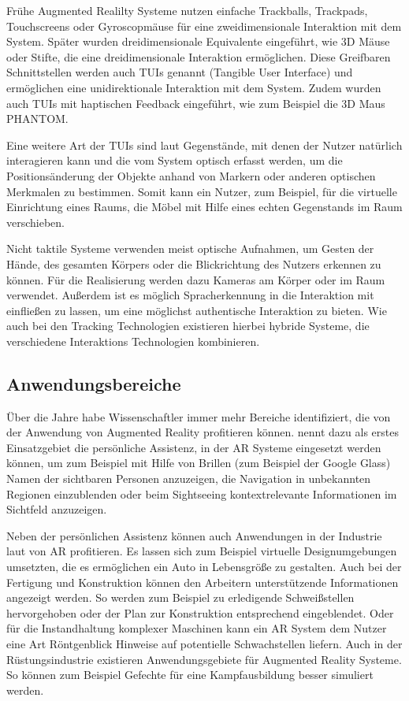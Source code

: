 Frühe Augmented Realilty Systeme nutzen einfache Trackballs, Trackpads, Touchscreens oder Gyroscopmäuse für eine zweidimensionale Interaktion mit dem System. Später wurden dreidimensionale Equivalente eingeführt, wie 3D Mäuse oder Stifte, die eine dreidimensionale Interaktion ermöglichen. Diese Greifbaren Schnittstellen werden auch TUIs genannt (Tangible User Interface) und ermöglichen eine unidirektionale Interaktion mit dem System. Zudem wurden auch TUIs mit haptischen Feedback eingeführt, wie zum Beispiel die 3D Maus PHANTOM. \citep{van2010survey} 

Eine weitere Art der TUIs sind laut \citet{azuma2001recent} Gegenstände, mit denen der Nutzer natürlich interagieren kann und die vom System optisch erfasst werden, um die Positionsänderung der Objekte anhand von Markern oder anderen optischen Merkmalen zu bestimmen. Somit kann ein Nutzer, zum Beispiel, für die virtuelle Einrichtung eines Raums, die Möbel mit Hilfe eines echten Gegenstands im Raum verschieben. 

Nicht taktile Systeme verwenden meist optische Aufnahmen, um Gesten der Hände, des gesamten Körpers oder die Blickrichtung des Nutzers erkennen zu können. Für die Realisierung werden dazu Kameras am Körper oder im Raum verwendet. Außerdem ist es möglich Spracherkennung in die Interaktion mit einfließen zu lassen, um eine möglichst authentische Interaktion zu bieten. Wie auch bei den Tracking Technologien existieren hierbei hybride Systeme, die verschiedene Interaktions Technologien kombinieren. \citep{van2010survey} 

\subsection{Anwendungsbereiche}

Über die Jahre habe Wissenschaftler immer mehr Bereiche identifiziert, die von der Anwendung von Augmented Reality profitieren können. \citet{van2010survey} nennt dazu als erstes Einsatzgebiet die persönliche Assistenz, in der AR Systeme eingesetzt werden können, um zum Beispiel mit Hilfe von Brillen (zum Beispiel der Google Glass) Namen der sichtbaren Personen anzuzeigen, die Navigation in unbekannten Regionen einzublenden oder beim Sightseeing kontextrelevante Informationen im Sichtfeld anzuzeigen. 

Neben der persönlichen Assistenz können auch Anwendungen in der Industrie laut \citet{van2010survey} von AR profitieren. Es lassen sich zum Beispiel virtuelle Designumgebungen umsetzten, die es ermöglichen ein Auto in Lebensgröße zu gestalten. Auch bei der Fertigung und Konstruktion können den Arbeitern unterstützende Informationen angezeigt werden. So werden zum Beispiel zu erledigende Schweißstellen hervorgehoben oder der Plan zur Konstruktion entsprechend eingeblendet. Oder für die Instandhaltung komplexer Maschinen kann ein AR System dem Nutzer eine Art Röntgenblick Hinweise auf potentielle Schwachstellen liefern. Auch in der Rüstungsindustrie existieren Anwendungsgebiete für Augmented Reality Systeme. So können zum Beispiel Gefechte für eine Kampfausbildung besser simuliert werden. \citep{azuma2001recent} 

